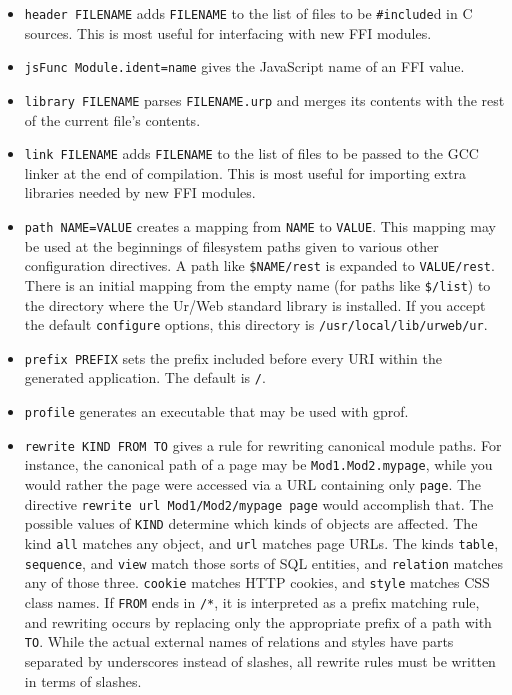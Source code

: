 \documentclass{article}
\begin{document}
\begin{itemize}
\item \texttt{header FILENAME} adds \texttt{FILENAME} to the list of files to be \texttt{\#include}d in C sources.  This is most useful for interfacing with new FFI modules.
\item \texttt{jsFunc Module.ident=name} gives the JavaScript name of an FFI value.
\item \texttt{library FILENAME} parses \texttt{FILENAME.urp} and merges its contents with the rest of the current file's contents.
\item \texttt{link FILENAME} adds \texttt{FILENAME} to the list of files to be passed to the GCC linker at the end of compilation.  This is most useful for importing extra libraries needed by new FFI modules.
\item \texttt{path NAME=VALUE} creates a mapping from \texttt{NAME} to \texttt{VALUE}.  This mapping may be used at the beginnings of filesystem paths given to various other configuration directives.  A path like \texttt{\$NAME/rest} is expanded to \texttt{VALUE/rest}.  There is an initial mapping from the empty name (for paths like \texttt{\$/list}) to the directory where the Ur/Web standard library is installed.  If you accept the default \texttt{configure} options, this directory is \texttt{/usr/local/lib/urweb/ur}.
\item \texttt{prefix PREFIX} sets the prefix included before every URI within the generated application.  The default is \texttt{/}.
\item \texttt{profile} generates an executable that may be used with gprof.
\item \texttt{rewrite KIND FROM TO} gives a rule for rewriting canonical module paths.  For instance, the canonical path of a page may be \texttt{Mod1.Mod2.mypage}, while you would rather the page were accessed via a URL containing only \texttt{page}.  The directive \texttt{rewrite url Mod1/Mod2/mypage page} would accomplish that.  The possible values of \texttt{KIND} determine which kinds of objects are affected.  The kind \texttt{all} matches any object, and \texttt{url} matches page URLs.  The kinds \texttt{table}, \texttt{sequence}, and \texttt{view} match those sorts of SQL entities, and \texttt{relation} matches any of those three.  \texttt{cookie} matches HTTP cookies, and \texttt{style} matches CSS class names.  If \texttt{FROM} ends in \texttt{/*}, it is interpreted as a prefix matching rule, and rewriting occurs by replacing only the appropriate prefix of a path with \texttt{TO}.  While the actual external names of relations and styles have parts separated by underscores instead of slashes, all rewrite rules must be written in terms of slashes.

\end{itemize}
\end{document}
